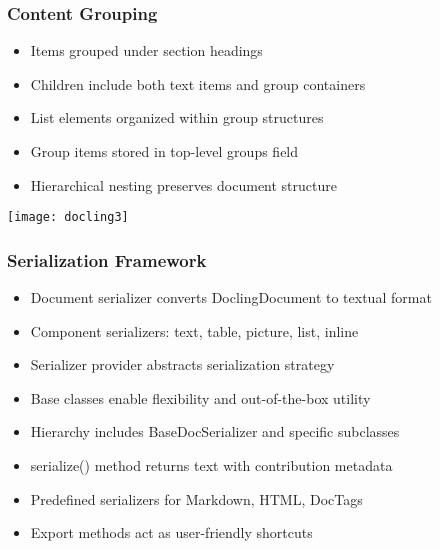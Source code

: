 \begin{frame}[fragile]\frametitle{Content Grouping}

      \begin{itemize}
		\item Items grouped under section headings
		\item Children include both text items and group containers
		\item List elements organized within group structures
		\item Group items stored in top-level groups field
		\item Hierarchical nesting preserves document structure
	  \end{itemize}

		\begin{center}
		\texttt{[image: docling3]}
		\end{center}	

\end{frame}

\begin{frame}[fragile]\frametitle{Serialization Framework}
      \begin{itemize}
	\item Document serializer converts DoclingDocument to textual format
	\item Component serializers: text, table, picture, list, inline
	\item Serializer provider abstracts serialization strategy
	\item Base classes enable flexibility and out-of-the-box utility
	\item Hierarchy includes BaseDocSerializer and specific subclasses
	\item serialize() method returns text with contribution metadata
	\item Predefined serializers for Markdown, HTML, DocTags
	\item Export methods act as user-friendly shortcuts
	  \end{itemize}
\end{frame}

